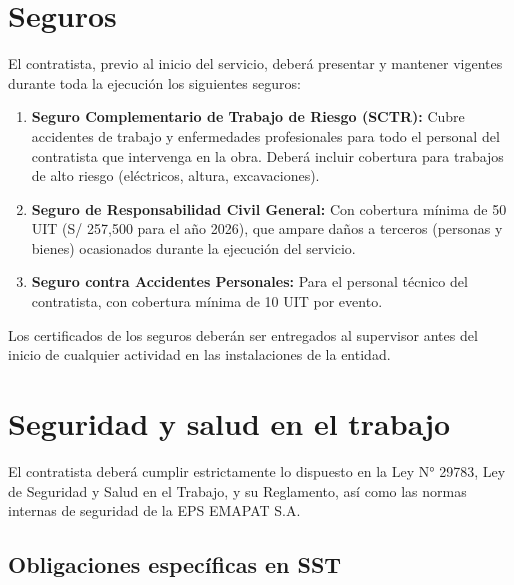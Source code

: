 \documentclass[12pt,a4paper]{article}
\begin{document}
\section{Seguros}

El contratista, previo al inicio del servicio, deberá presentar y mantener vigentes durante toda la ejecución los siguientes seguros:

\begin{enumerate}
  \item \textbf{Seguro Complementario de Trabajo de Riesgo (SCTR):} Cubre accidentes de trabajo y enfermedades profesionales para todo el personal del contratista que intervenga en la obra. Deberá incluir cobertura para trabajos de alto riesgo (eléctricos, altura, excavaciones).
  \item \textbf{Seguro de Responsabilidad Civil General:} Con cobertura mínima de 50 UIT (S/ 257,500 para el año 2026), que ampare daños a terceros (personas y bienes) ocasionados durante la ejecución del servicio.
  \item \textbf{Seguro contra Accidentes Personales:} Para el personal técnico del contratista, con cobertura mínima de 10 UIT por evento.
\end{enumerate}

Los certificados de los seguros deberán ser entregados al supervisor antes del inicio de cualquier actividad en las instalaciones de la entidad.

\section{Seguridad y salud en el trabajo}

El contratista deberá cumplir estrictamente lo dispuesto en la Ley N° 29783, Ley de Seguridad y Salud en el Trabajo, y su Reglamento, así como las normas internas de seguridad de la EPS EMAPAT S.A.

\subsection{Obligaciones específicas en SST}
\end{document}
